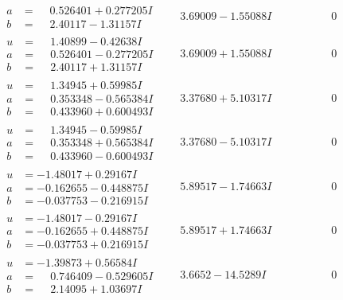\documentclass[1p]{elsarticle_modified}
\theoremstyle{definition}
\begin{document}
$$\begin{array}{c|c|c}
\begin{aligned}
a &= \phantom{-}0.526401 + 0.277205 I \\
b &= \phantom{-}2.40117 - 1.31157 I\end{aligned}
 & \phantom{-}3.69009 - 1.55088 I & \phantom{-0.000000 } 0 \\ \hline\begin{aligned}
u &= \phantom{-}1.40899 - 0.42638 I \\
a &= \phantom{-}0.526401 - 0.277205 I \\
b &= \phantom{-}2.40117 + 1.31157 I\end{aligned}
 & \phantom{-}3.69009 + 1.55088 I & \phantom{-0.000000 } 0 \\ \hline\begin{aligned}
u &= \phantom{-}1.34945 + 0.59985 I \\
a &= \phantom{-}0.353348 - 0.565384 I \\
b &= \phantom{-}0.433960 + 0.600493 I\end{aligned}
 & \phantom{-}3.37680 + 5.10317 I & \phantom{-0.000000 } 0 \\ \hline\begin{aligned}
u &= \phantom{-}1.34945 - 0.59985 I \\
a &= \phantom{-}0.353348 + 0.565384 I \\
b &= \phantom{-}0.433960 - 0.600493 I\end{aligned}
 & \phantom{-}3.37680 - 5.10317 I & \phantom{-0.000000 } 0 \\ \hline\begin{aligned}
u &= -1.48017 + 0.29167 I \\
a &= -0.162655 - 0.448875 I \\
b &= -0.037753 - 0.216915 I\end{aligned}
 & \phantom{-}5.89517 - 1.74663 I & \phantom{-0.000000 } 0 \\ \hline\begin{aligned}
u &= -1.48017 - 0.29167 I \\
a &= -0.162655 + 0.448875 I \\
b &= -0.037753 + 0.216915 I\end{aligned}
 & \phantom{-}5.89517 + 1.74663 I & \phantom{-0.000000 } 0 \\ \hline\begin{aligned}
u &= -1.39873 + 0.56584 I \\
a &= \phantom{-}0.746409 - 0.529605 I \\
b &= \phantom{-}2.14095 + 1.03697 I\end{aligned}
 & \phantom{-}3.6652 - 14.5289 I & \phantom{-0.000000 } 0\\

\end{array}$$
\end{document}
